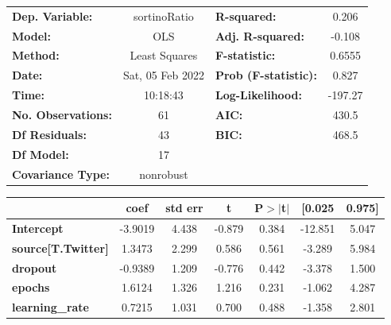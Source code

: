 \begin{center}
\begin{tabular}{lclc}
\toprule
\textbf{Dep. Variable:}                   &   sortinoRatio   & \textbf{  R-squared:         } &     0.206   \\
\textbf{Model:}                           &       OLS        & \textbf{  Adj. R-squared:    } &    -0.108   \\
\textbf{Method:}                          &  Least Squares   & \textbf{  F-statistic:       } &    0.6555   \\
\textbf{Date:}                            & Sat, 05 Feb 2022 & \textbf{  Prob (F-statistic):} &    0.827    \\
\textbf{Time:}                            &     10:18:43     & \textbf{  Log-Likelihood:    } &   -197.27   \\
\textbf{No. Observations:}                &          61      & \textbf{  AIC:               } &     430.5   \\
\textbf{Df Residuals:}                    &          43      & \textbf{  BIC:               } &     468.5   \\
\textbf{Df Model:}                        &          17      & \textbf{                     } &             \\
\textbf{Covariance Type:}                 &    nonrobust     & \textbf{                     } &             \\
\bottomrule
\end{tabular}
\begin{tabular}{lcccccc}
                                          & \textbf{coef} & \textbf{std err} & \textbf{t} & \textbf{P$> |$t$|$} & \textbf{[0.025} & \textbf{0.975]}  \\
\midrule
\textbf{Intercept}                        &      -3.9019  &        4.438     &    -0.879  &         0.384        &      -12.851    &        5.047     \\
\textbf{source[T.Twitter]}                &       1.3473  &        2.299     &     0.586  &         0.561        &       -3.289    &        5.984     \\
\textbf{dropout}                          &      -0.9389  &        1.209     &    -0.776  &         0.442        &       -3.378    &        1.500     \\
\textbf{epochs}                           &       1.6124  &        1.326     &     1.216  &         0.231        &       -1.062    &        4.287     \\
\textbf{learning\_rate}                   &       0.7215  &        1.031     &     0.700  &         0.488        &       -1.358    &        2.801     \\

\end{tabular}
\end{center}
